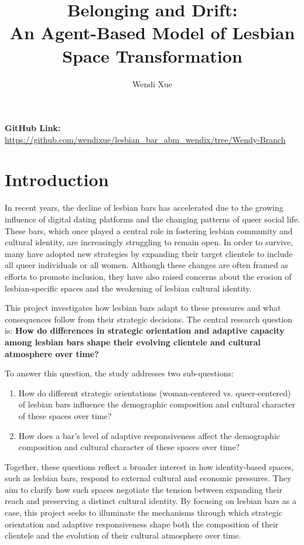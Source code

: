 \documentclass{article}
\title{Belonging and Drift:\\ An Agent-Based Model of Lesbian Space Transformation}
\author{Wendi Xue}
\date{}
\begin{document}
\maketitle

\textbf{GitHub Link:} \url{https://github.com/wendixue/lesbian_bar_abm_wendix/tree/Wendy-Branch}

\section{Introduction}

\indent

In recent years, the decline of lesbian bars has accelerated due to the growing influence of digital dating platforms and the changing patterns of queer social life. These bars, which once played a central role in fostering lesbian community and cultural identity, are increasingly struggling to remain open. In order to survive, many have adopted new strategies by expanding their target clientele to include all queer individuals or all women. Although these changes are often framed as efforts to promote inclusion, they have also raised concerns about the erosion of lesbian-specific spaces and the weakening of lesbian cultural identity.

This project investigates how lesbian bars adapt to these pressures and what consequences follow from their strategic decisions. The central research question is: \textbf{How do differences in strategic orientation and adaptive capacity among lesbian bars shape their evolving clientele and cultural atmosphere over time?}

To answer this question, the study addresses two sub-questions:
\begin{enumerate}
    \item How do different strategic orientations (woman-centered vs. queer-centered) of lesbian bars influence the demographic composition and cultural character of these spaces over time?
    \item How does a bar’s level of adaptive responsiveness affect the demographic composition and cultural character of these spaces over time?
\end{enumerate}

Together, these questions reflect a broader interest in how identity-based spaces, such as lesbian bars, respond to external cultural and economic pressures. They aim to clarify how such spaces negotiate the tension between expanding their reach and preserving a distinct cultural identity. By focusing on lesbian bars as a case, this project seeks to illuminate the mechanisms through which strategic orientation and adaptive responsiveness shape both the composition of their clientele and the evolution of their cultural atmosphere over time.
\end{document}

